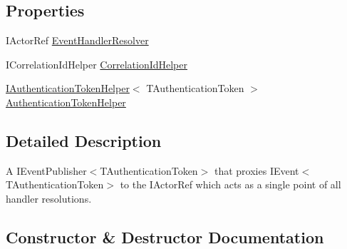 \subsection*{Properties}
\begin{DoxyCompactItemize}
\item 
I\+Actor\+Ref \hyperlink{classCqrs_1_1Akka_1_1Events_1_1AkkaEventBusProxy_abd36f5db7a03a38d573b11c0d6f37117}{Event\+Handler\+Resolver}
\item 
I\+Correlation\+Id\+Helper \hyperlink{classCqrs_1_1Akka_1_1Events_1_1AkkaEventBusProxy_a4cc4ec0ece94393246b0c64f02d55f41}{Correlation\+Id\+Helper}
\item 
\hyperlink{interfaceCqrs_1_1Authentication_1_1IAuthenticationTokenHelper}{I\+Authentication\+Token\+Helper}$<$ T\+Authentication\+Token $>$ \hyperlink{classCqrs_1_1Akka_1_1Events_1_1AkkaEventBusProxy_a54964db320ef21b0564e66e9f258f694}{Authentication\+Token\+Helper}
\end{DoxyCompactItemize}


\subsection{Detailed Description}
A I\+Event\+Publisher$<$\+T\+Authentication\+Token$>$ that proxies I\+Event$<$\+T\+Authentication\+Token$>$ to the I\+Actor\+Ref which acts as a single point of all handler resolutions. 



\subsection{Constructor \& Destructor Documentation}
\mbox{\label{classCqrs_1_1Akka_1_1Events_1_1AkkaEventBusProxy_a2f886b4e9e64188fe69478c39c96f2b5}} 
